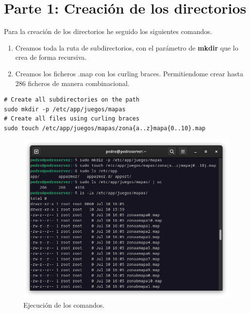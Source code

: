 
\section{Parte 1: Creación de los directorios}

Para la creación de los directorios he seguido los siguientes comandos.

\begin{enumerate}
\item Creamos toda la ruta de subdirectorios, con el parámetro de \textbf{mkdir} que lo crea de forma recursiva.
\item Creamos los ficheros .map con los curling braces. Permitiendome crear hasta 286 ficheros de manera combinacional. 
\end{enumerate}

\begin{lstlisting}[style=mybash]
# Create all subdirectories on the path
sudo mkdir -p /etc/app/juegos/mapas
# Create all files using curling braces
sudo touch /etc/app/juegos/mapas/zona{a..z}mapa{0..10}.map
\end{lstlisting}

\begin{figure}[H]
	\centering
	\includegraphics[scale=0.40]{00}
	\caption{Ejecución de los comandos.}
\end{figure}

\newpage
